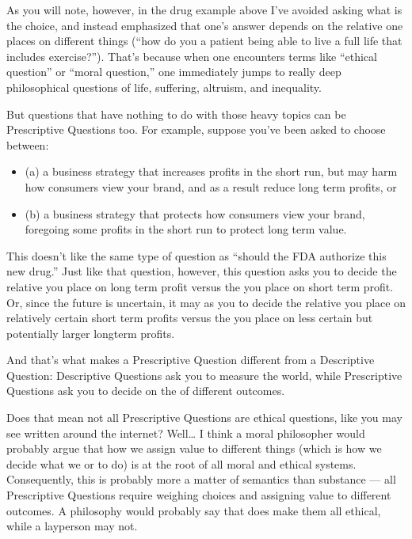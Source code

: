 \documentclass[letterpaper,10pt,english]{jupyterBook}
\begin{document}
\sphinxAtStartPar
As you will note, however, in the drug example above I’ve avoided asking what is the  choice, and instead emphasized that one’s answer depends on the relative  one places on different things (“how do you  a patient being able to live a full life that includes exercise?”). That’s because when one encounters terms like “ethical question” or “moral question,” one immediately jumps to really deep philosophical questions of life, suffering, altruism, and inequality.

\sphinxAtStartPar
But questions that have nothing to do with those heavy topics can be Prescriptive Questions too. For example, suppose you’ve been asked to choose between:
\begin{itemize}
\item {} 
\sphinxAtStartPar
(a) a business strategy that increases profits in the short run, but may harm how consumers view your brand, and as a result reduce long term profits, or

\item {} 
\sphinxAtStartPar
(b) a business strategy that protects how consumers view your brand, foregoing some profits in the short run to protect long term value.

\end{itemize}

\sphinxAtStartPar
This doesn’t  like the same type of question as “should the FDA authorize this new drug.” Just like that question, however, this question asks you to decide the relative  you place on long term profit versus the  you place on short term profit. Or, since the future is uncertain, it may as you to decide the relative  you place on relatively certain short term profits versus the  you place on less certain but potentially larger long\sphinxhyphen{}term profits.

\sphinxAtStartPar
And that’s what makes a Prescriptive Question different from a Descriptive Question: Descriptive Questions ask you to measure the world, while Prescriptive Questions ask you to decide on the  of different outcomes.

\sphinxAtStartPar
Does that mean not all Prescriptive Questions are ethical questions, like you may see written around the internet? Well… I think a moral philosopher would probably argue that how we assign value to different things (which is how we decide what we  or  to do) is at the root of all moral and ethical systems. Consequently, this is probably more a matter of semantics than substance — all Prescriptive Questions require weighing choices and assigning value to different outcomes. A philosophy would probably say that does make them all ethical, while a layperson may not.
\end{document}
